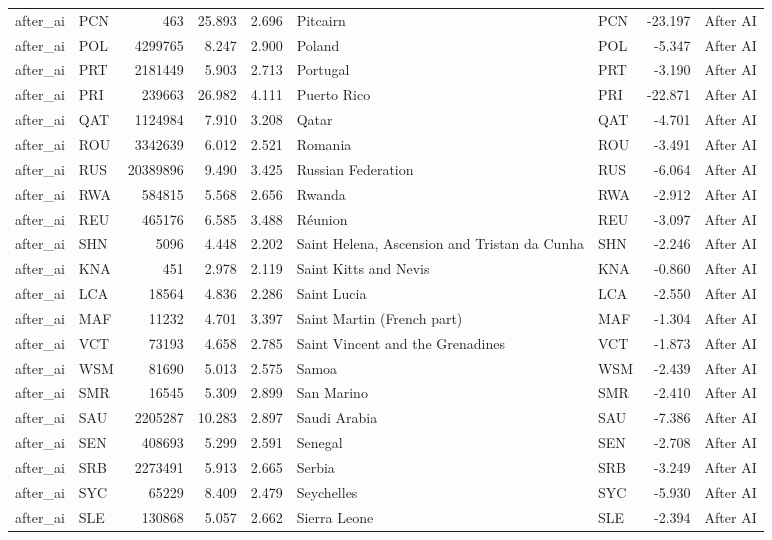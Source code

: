 \begin{tabular}{llrrrllrl}
after\_ai & PCN & 463 & 25.893 & 2.696 & Pitcairn & PCN & -23.197 & After AI \\
after\_ai & POL & 4299765 & 8.247 & 2.900 & Poland & POL & -5.347 & After AI \\
after\_ai & PRT & 2181449 & 5.903 & 2.713 & Portugal & PRT & -3.190 & After AI \\
after\_ai & PRI & 239663 & 26.982 & 4.111 & Puerto Rico & PRI & -22.871 & After AI \\
after\_ai & QAT & 1124984 & 7.910 & 3.208 & Qatar & QAT & -4.701 & After AI \\
after\_ai & ROU & 3342639 & 6.012 & 2.521 & Romania & ROU & -3.491 & After AI \\
after\_ai & RUS & 20389896 & 9.490 & 3.425 & Russian Federation & RUS & -6.064 & After AI \\
after\_ai & RWA & 584815 & 5.568 & 2.656 & Rwanda & RWA & -2.912 & After AI \\
after\_ai & REU & 465176 & 6.585 & 3.488 & Réunion & REU & -3.097 & After AI \\
after\_ai & SHN & 5096 & 4.448 & 2.202 & Saint Helena, Ascension and Tristan da Cunha & SHN & -2.246 & After AI \\
after\_ai & KNA & 451 & 2.978 & 2.119 & Saint Kitts and Nevis & KNA & -0.860 & After AI \\
after\_ai & LCA & 18564 & 4.836 & 2.286 & Saint Lucia & LCA & -2.550 & After AI \\
after\_ai & MAF & 11232 & 4.701 & 3.397 & Saint Martin (French part) & MAF & -1.304 & After AI \\
after\_ai & VCT & 73193 & 4.658 & 2.785 & Saint Vincent and the Grenadines & VCT & -1.873 & After AI \\
after\_ai & WSM & 81690 & 5.013 & 2.575 & Samoa & WSM & -2.439 & After AI \\
after\_ai & SMR & 16545 & 5.309 & 2.899 & San Marino & SMR & -2.410 & After AI \\
after\_ai & SAU & 2205287 & 10.283 & 2.897 & Saudi Arabia & SAU & -7.386 & After AI \\
after\_ai & SEN & 408693 & 5.299 & 2.591 & Senegal & SEN & -2.708 & After AI \\
after\_ai & SRB & 2273491 & 5.913 & 2.665 & Serbia & SRB & -3.249 & After AI \\
after\_ai & SYC & 65229 & 8.409 & 2.479 & Seychelles & SYC & -5.930 & After AI \\
after\_ai & SLE & 130868 & 5.057 & 2.662 & Sierra Leone & SLE & -2.394 & After AI \\

\end{tabular}
